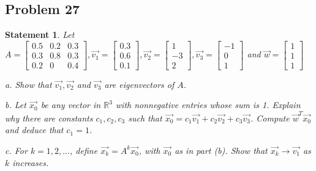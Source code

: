 \documentclass[12pt, letterpaper]{article}
\newcommand{\R}{\mathbb{R}}
\theoremstyle{statement}
\theoremstyle{statement}
\newtheorem*{atmStat}{Statement}
\begin{document}
    \subsection*{Problem 27}
    \begin{atmStat}
    Let $A=\begin{bmatrix} 0.5 & 0.2 & 0.3 \\ 0.3 & 0.8 & 0.3 \\ 0.2 & 0 & 0.4 \end{bmatrix}, \Vec{v_1}=\begin{bmatrix} 0.3\\0.6\\0.1\end{bmatrix}, \Vec{v_2}=\begin{bmatrix} 1\\-3\\2\end{bmatrix}, \Vec{v_3}=\begin{bmatrix}-1\\0\\1\end{bmatrix}$ and $\Vec{w}=\begin{bmatrix} 1\\1\\1 \end{bmatrix}$
    
    a. Show that $\Vec{v_1}, \Vec{v_2}$ and $\Vec{v_3}$ are eigenvectors of $A$.
    
    b. Let $\Vec{x_0}$ be any vector in $\R^3$ with nonnegative entries whose sum is 1. Explain why there are constants $c_1, c_2, c_3$ such that $\Vec{x_0}=c_1\Vec{v_1}+c_2\Vec{v_2}+c_3\Vec{v_3}$. Compute $\Vec{w}^T\Vec{x_0}$ and deduce that $c_1=1$.
    
    c. For $k=1,2,\dots$, define $\Vec{x_k}=A^k\Vec{x_0}$, with $\Vec{x_0}$ as in part (b). Show that $\Vec{x_k}\longrightarrow \Vec{v_1}$ as $k$ increases.
    \end{atmStat}
\end{document}
